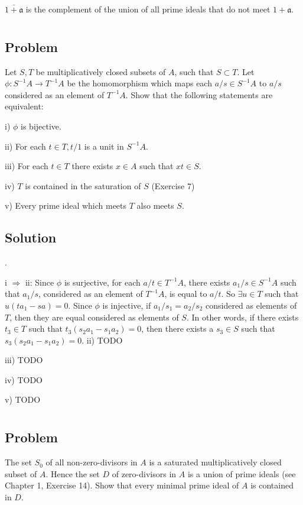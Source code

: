\documentclass[book,12pt,oneside,openany]{memoir}
\begin{document}
$\bar{1 + \mathfrak{a}}$ is the complement of the union of all prime ideals that do not meet $1 + \mathfrak{a}$.

\section{}
\subsection{Problem}
Let $S,T$ be multiplicatively closed subsets of $A$, such that $S \subset T$. Let $\phi: S^{-1}A \rightarrow T^{-1}A$ be the homomorphism which maps each $a/s \in S^{-1}A$ to $a/s$ considered as an element of $T^{-1}A$. Show that the following statements are equivalent:

i) $\phi$ is bijective.

ii) For each $t \in T, t/1$ is a unit in $S^{-1}A$.

iii) For each $t \in T$ there exists $x \in A$ such that $xt \in S$.

iv) $T$ is contained in the saturation of $S$ (Exercise 7)

v) Every prime ideal which meets $T$ also meets $S$.

\subsection{Solution}
.

i $\Rightarrow$ ii: Since $\phi$ is surjective, for each $a/t \in T^{-1}A$, there exists $a_1/s \in S^{-1}A$ such that $a_1/s$, considered as an element of $T^{-1}A$, is equal to $a/t$. So $\exists u \in T$ such that $u(ta_1 - sa) = 0$. Since $\phi$ is injective, if $a_1/s_1 = a_2/s_2$ considered as elements of $T$, then they are equal considered as elements of $S$. In other words, if there exists $t_3 \in T$ such that $t_3 (s_2 a_1 - s_1 a_2) = 0$, then there exists a $s_3 \in S$ such that $s_3 (s_2 a_1 - s_1 a_2) = 0$. 
ii) TODO

iii) TODO

iv) TODO

v) TODO

\section{}
\subsection{Problem}
The set $S_0$ of all non-zero-divisors in $A$ is a saturated multiplicatively closed subset of $A$. Hence the set $D$ of zero-divisors in $A$ is a union of prime ideals (see Chapter 1, Exercise 14). Show that every minimal prime ideal of $A$ is contained in $D$.
\end{document}
